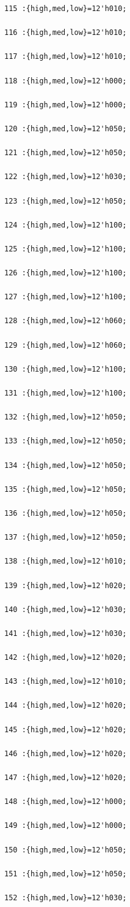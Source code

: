 \documentclass[UTF8]{ctexart}
\begin{document}
\begin{verbatim}
115 :{high,med,low}=12'h010;

116 :{high,med,low}=12'h010;

117 :{high,med,low}=12'h010;

118 :{high,med,low}=12'h000;

119 :{high,med,low}=12'h000;

120 :{high,med,low}=12'h050;

121 :{high,med,low}=12'h050;

122 :{high,med,low}=12'h030;

123 :{high,med,low}=12'h050;

124 :{high,med,low}=12'h100;

125 :{high,med,low}=12'h100;

126 :{high,med,low}=12'h100;

127 :{high,med,low}=12'h100;

128 :{high,med,low}=12'h060;

129 :{high,med,low}=12'h060;

130 :{high,med,low}=12'h100;

131 :{high,med,low}=12'h100;

132 :{high,med,low}=12'h050;

133 :{high,med,low}=12'h050;

134 :{high,med,low}=12'h050;

135 :{high,med,low}=12'h050;

136 :{high,med,low}=12'h050;

137 :{high,med,low}=12'h050;

138 :{high,med,low}=12'h010;

139 :{high,med,low}=12'h020;

140 :{high,med,low}=12'h030;

141 :{high,med,low}=12'h030;

142 :{high,med,low}=12'h020;

143 :{high,med,low}=12'h010;

144 :{high,med,low}=12'h020;

145 :{high,med,low}=12'h020;

146 :{high,med,low}=12'h020;

147 :{high,med,low}=12'h020;

148 :{high,med,low}=12'h000;

149 :{high,med,low}=12'h000;

150 :{high,med,low}=12'h050;

151 :{high,med,low}=12'h050;

152 :{high,med,low}=12'h030;


\end{verbatim}
\end{document}
